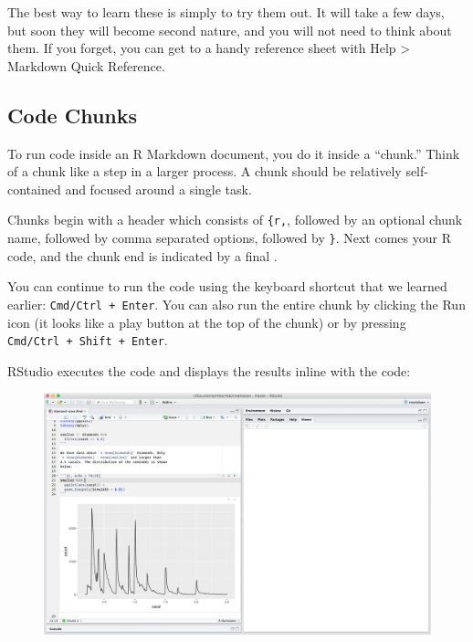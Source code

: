 \documentclass[]{book}
\begin{document}
The best way to learn these is simply to try them out. It will take a
few days, but soon they will become second nature, and you will not need
to think about them. If you forget, you can get to a handy reference
sheet with Help \textgreater{} Markdown Quick Reference.

\subsection{Code Chunks}\label{code-chunks}

To run code inside an R Markdown document, you do it inside a ``chunk.''
Think of a chunk like a step in a larger process. A chunk should be
relatively self-contained and focused around a single task.

Chunks begin with a header which consists of
\texttt{\textasciigrave{}\textasciigrave{}\textasciigrave{}\{r,},
followed by an optional chunk name, followed by comma separated options,
followed by \texttt{\}}. Next comes your R code, and the chunk end is
indicated by a final
\texttt{\textasciigrave{}\textasciigrave{}\textasciigrave{}}.

You can continue to run the code using the keyboard shortcut that we
learned earlier: \texttt{Cmd/Ctrl\ +\ Enter}. You can also run the
entire chunk by clicking the Run icon (it looks like a play button at
the top of the chunk) or by pressing
\texttt{Cmd/Ctrl\ +\ Shift\ +\ Enter}.

RStudio executes the code and displays the results inline with the code:

\begin{figure}
\centering
\includegraphics{img/r-markdown.png}
\caption{}
\end{figure}
\end{document}
